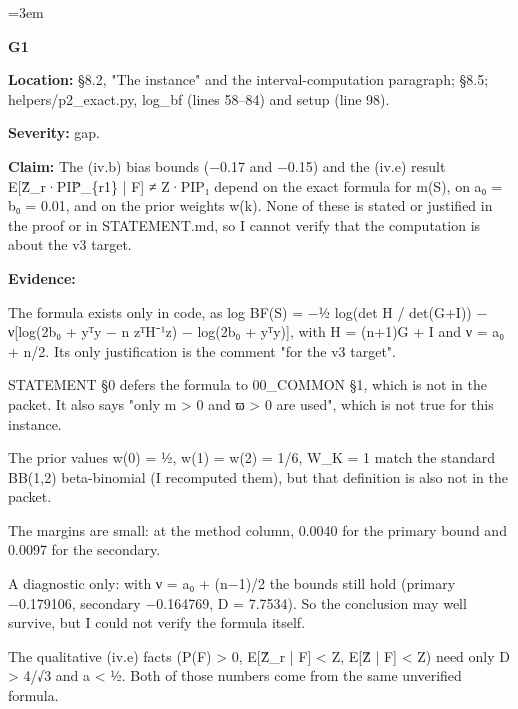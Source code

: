 \documentclass[11pt]{report}
\newenvironment{mdblock}{\begingroup\mdfont\raggedright\setlength{\parindent}{0pt}\setlength{\parskip}{0.55em}\emergencystretch=3em}{\par\endgroup}
\newenvironment{mdquote}{\begin{list}{}{\setlength{\leftmargin}{1.2em}\setlength{\rightmargin}{0pt}\setlength{\topsep}{2pt}\setlength{\parsep}{0.55em}\setlength{\itemsep}{0pt}}\item\relax}{\end{list}}
\begin{document}
\begin{mdblock}
\begin{mdquote}
\textbf{G1}

\begin{mdbul}
\item \textbf{Location:} §8.2, "The instance" and the interval-computation paragraph; §8.5; {\mdtt helpers/\allowbreak{}p2\_\allowbreak{}exact.\allowbreak{}py}, {\mdtt log\_\allowbreak{}bf} (lines 58–84) and {\mdtt setup} (line 98).
\item \textbf{Severity:} gap.
\item \textbf{Claim:} The (iv.b) bias bounds (−0.17 and −0.15) and the (iv.e) result E[Ẑ\_r·PIP̂\_\{r1\} | F] ≠ Z·PIP₁ depend on the exact formula for m(S), on a₀ = b₀ = 0.01, and on the prior weights w(k). None of these is stated or justified in the proof or in STATEMENT.md, so I cannot verify that the computation is about the v3 target.
\item \textbf{Evidence:}

\begin{mdbul}
\item The formula exists only in code, as log BF(S) = −½ log(det H / det(G+I)) − ν[log(2b₀ + yᵀy − n zᵀH⁻¹z) − log(2b₀ + yᵀy)], with H = (n+1)G + I and ν = a₀ + n/2. Its only justification is the comment "for the v3 target".
\item STATEMENT §0 defers the formula to 00\_COMMON §1, which is not in the packet. It also says "only m > 0 and ϖ > 0 are used", which is not true for this instance.
\item The prior values w(0) = ½, w(1) = w(2) = 1/6, W\_K = 1 match the standard BB(1,2) beta-binomial (I recomputed them), but that definition is also not in the packet.
\item The margins are small: at the method column, 0.0040 for the primary bound and 0.0097 for the secondary.
\item A diagnostic only: with ν = a₀ + (n−1)/2 the bounds still hold (primary −0.179106, secondary −0.164769, D = 7.7534). So the conclusion may well survive, but I could not verify the formula itself.
\item The qualitative (iv.e) facts (P(F) > 0, E[Ẑ\_r | F] < Z, E[Ẑ | F] < Z) need only D > 4/√3 and a < ½. Both of those numbers come from the same unverified formula.
\end{mdbul}
\end{mdbul}
\end{mdquote}


\end{mdblock}
\end{document}
